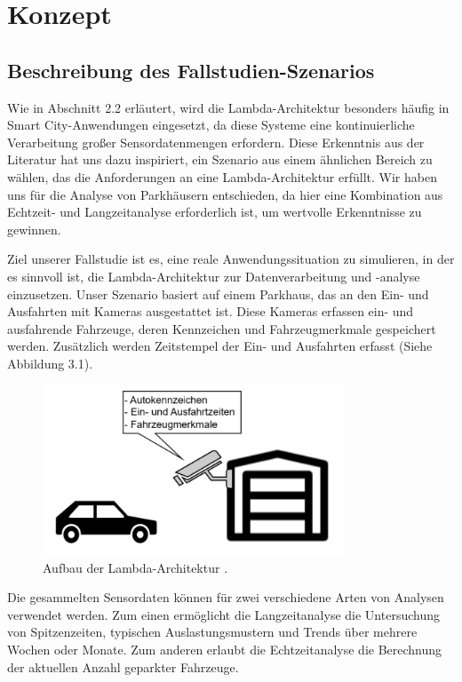 \chapter{Konzept}

\section{Beschreibung des Fallstudien-Szenarios}
Wie in Abschnitt 2.2 erläutert, wird die Lambda-Architektur besonders häufig in Smart City-Anwendungen eingesetzt, da diese Systeme eine kontinuierliche Verarbeitung großer Sensordatenmengen erfordern. Diese Erkenntnis aus der Literatur hat uns dazu inspiriert, ein Szenario aus einem ähnlichen Bereich zu wählen, das die Anforderungen an eine Lambda-Architektur erfüllt. Wir haben uns für die Analyse von Parkhäusern entschieden, da hier eine Kombination aus Echtzeit- und Langzeitanalyse erforderlich ist, um wertvolle Erkenntnisse zu gewinnen.

Ziel unserer Fallstudie ist es, eine reale Anwendungssituation zu simulieren, in der es sinnvoll ist, die Lambda-Architektur zur Datenverarbeitung und -analyse einzusetzen. Unser Szenario basiert auf einem Parkhaus, das an den Ein- und Ausfahrten mit Kameras ausgestattet ist. Diese Kameras erfassen ein- und ausfahrende Fahrzeuge, deren Kennzeichen und Fahrzeugmerkmale gespeichert werden. Zusätzlich werden Zeitstempel der Ein- und Ausfahrten erfasst (Siehe Abbildung 3.1).

\begin{figure}[h] %
    \centering
    \includegraphics[width=0.8\textwidth]{Graphics/Parkhaus.png} %
    \caption{Aufbau der Lambda-Architektur \cite{entwickler_lambda_kappa}.}
    \label{fig:beispielbild}
\end{figure}

Die gesammelten Sensordaten können für zwei verschiedene Arten von Analysen verwendet werden. Zum einen ermöglicht die Langzeitanalyse die Untersuchung von Spitzenzeiten, typischen Auslastungsmustern und Trends über mehrere Wochen oder Monate.  Zum anderen erlaubt die Echtzeitanalyse die Berechnung der aktuellen Anzahl geparkter Fahrzeuge.

